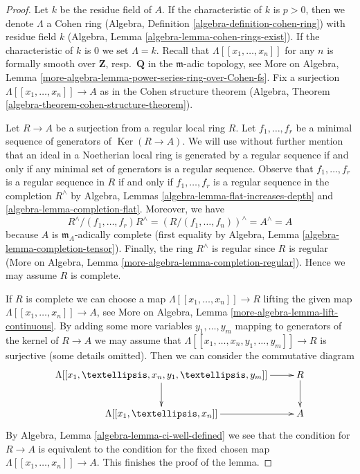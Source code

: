 \documentclass{stacks-project}
\theoremstyle{plain}
\theoremstyle{definition}
\theoremstyle{remark}
\numberwithin{equation}{subsection}
\def\Ker{\mathop{\mathrm{Ker}}}
\begin{document}
\begin{proof}
Let $k$ be the residue field of $A$. If the characteristic of
$k$ is $p > 0$, then we denote $\Lambda$ a Cohen ring
(Algebra, Definition \ref{algebra-definition-cohen-ring})
with residue field $k$ (Algebra, Lemma \ref{algebra-lemma-cohen-rings-exist}).
If the characteristic of $k$ is $0$ we set $\Lambda = k$.
Recall that $\Lambda[[x_1, \ldots, x_n]]$ for any $n$
is formally smooth over $\mathbf{Z}$, resp.\ $\mathbf{Q}$
in the $\mathfrak m$-adic topology, see
More on Algebra, Lemma
\ref{more-algebra-lemma-power-series-ring-over-Cohen-fs}.
Fix a surjection $\Lambda[[x_1, \ldots, x_n]] \to A$ as in
the Cohen structure theorem
(Algebra, Theorem \ref{algebra-theorem-cohen-structure-theorem}).

\medskip\noindent
Let $R \to A$ be a surjection from a regular local ring $R$.
Let $f_1, \ldots, f_r$ be a minimal sequence of generators
of $\Ker(R \to A)$. We will use without further mention
that an ideal in a Noetherian local ring is generated by a regular
sequence if and only if any minimal set of generators is a
regular sequence. Observe that $f_1, \ldots, f_r$
is a regular sequence in $R$ if and only if $f_1, \ldots, f_r$
is a regular sequence in the completion $R^\wedge$ by
Algebra, Lemmas \ref{algebra-lemma-flat-increases-depth} and
\ref{algebra-lemma-completion-flat}.
Moreover, we have
$$
R^\wedge/(f_1, \ldots, f_r)R^\wedge =
(R/(f_1, \ldots, f_n))^\wedge = A^\wedge = A
$$
because $A$ is $\mathfrak m_A$-adically complete (first equality by
Algebra, Lemma \ref{algebra-lemma-completion-tensor}). Finally,
the ring $R^\wedge$ is regular since $R$ is regular
(More on Algebra, Lemma \ref{more-algebra-lemma-completion-regular}).
Hence we may assume $R$ is complete.

\medskip\noindent
If $R$ is complete we can choose a map
$\Lambda[[x_1, \ldots, x_n]] \to R$ lifting the given map
$\Lambda[[x_1, \ldots, x_n]] \to A$, see
More on Algebra, Lemma \ref{more-algebra-lemma-lift-continuous}.
By adding some more variables $y_1, \ldots, y_m$ mapping
to generators of the kernel of $R \to A$ we may assume that
$\Lambda[[x_1, \ldots, x_n, y_1, \ldots, y_m]] \to R$ is surjective
(some details omitted). Then we can consider the commutative diagram
$$
\xymatrix{
\Lambda[[x_1, \ldots, x_n, y_1, \ldots, y_m]] \ar[r] \ar[d] & R \ar[d] \\
\Lambda[[x_1, \ldots, x_n]] \ar[r] & A
}
$$
By Algebra, Lemma \ref{algebra-lemma-ci-well-defined} we see that
the condition for $R \to A$ is equivalent to the condition for
the fixed chosen map
$\Lambda[[x_1, \ldots, x_n]] \to A$. This finishes the proof of the lemma.
\end{proof}
\end{document}
